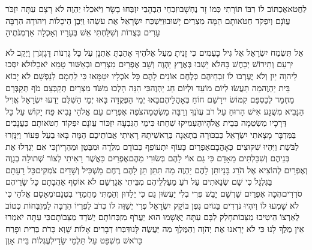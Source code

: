 \documentclass[../main/main.tex]{subfiles}
\begin{document}
\begin{multicols}{\ncols}
לַחֲטֹא\PreVerseSpace{}אֶכְתּוֹב לוֹ רִבּוֹ תּוֹרָתִי כְּמוֹ זָר נֶחְשָׁבוּ\PreVerseSpace{}זִבְחֵי הַבְהָבַי יִזְבְּחוּ בָשָׂר וַיֹּאכֵלוּ יַהְוֶה לֹא רָצָם עַתָּה יִזְכֹּר עֲוֺנָם וְיִפְקֹד חַטֹּאותָם הֵמָּה מִצְרַיִם יָשׁוּבוּ\PreVerseSpace{}וַיִּשְׁכַּח יִשְׂרָאֵל אֶת עֹשֵׂהוּ וַיִּבֶן הֵיכָלוֹת וִיהוּדָה הִרְבָּה עָרִים בְּצֻרוֹת וְשִׁלַּחְתִּי אֵשׁ בְּעָרָיו וְאָכְלָה אַרְמְנֹתֶיהָ\OpenSection{}\par
{}אַל תִּשְׂמַח יִשְׂרָאֵל אֶל גִּיל כָּעַמִּים כִּי זָנִיתָ מֵעַל אֱלֹהֶיךָ אָהַבְתָּ אֶתְנָן עַל כָּל גָּרְנוֹת דָּגָן\PreVerseSpace{}גֹּרֶן וָיֶקֶב לֹא יִרְעֵם וְתִירוֹשׁ יְכַחֶשׁ בָּהּ\PreVerseSpace{}לֹא יֵשְׁבוּ בְּאֶרֶץ יַהְוֶה וְשָׁב אֶפְרַיִם מִצְרַיִם וּבְאַשּׁוּר טָמֵא יֹאכֵלוּ\PreVerseSpace{}לֹא יִסְּכוּ לַיהוָה יַיִן וְלֹא יֶעֶרְבוּ לוֹ זִבְחֵיהֶם כְּלֶחֶם אוֹנִים לָהֶם כָּל אֹכְלָיו יִטַּמָּאוּ כִּי לַחְמָם לְנַפְשָׁם לֹא יָבוֹא בֵּית יַהְוֶה\PreVerseSpace{}מַה תַּעֲשׂוּ לְיוֹם מוֹעֵד וּלְיוֹם חַג יַהְוֶה\PreVerseSpace{}כִּי הִנֵּה הָלְכוּ מִשֹּׁד מִצְרַיִם תְּקַבְּצֵם מֹף תְּקַבְּרֵם מַחְמַד לְכַסְפָּם קִמּוֹשׂ יִירָשֵׁם חוֹחַ בְּאָהֳלֵיהֶם\PreVerseSpace{}בָּאוּ יְמֵי הַפְּקֻדָּה בָּאוּ יְמֵי הַשִּׁלֻּם יֵדְעוּ יִשְׂרָאֵל אֱוִיל הַנָּבִיא מְשֻׁגָּע אִישׁ הָרוּחַ עַל רֹב עֲוֺנְךָ וְרַבָּה מַשְׂטֵמָה\PreVerseSpace{}צֹפֶה אֶפְרַיִם עַם\SubEnd{} אֱלֹהָי נָבִיא פַּח יָקוֹשׁ עַל כָּל דְּרָכָיו מַשְׂטֵמָה בְּבֵית אֱלֹהָיו\PreVerseSpace{}הֶעְמִיקוּ שִׁחֵתוּ כִּימֵי הַגִּבְעָה יִזְכּוֹר עֲוֺנָם יִפְקוֹד חַטֹּאותָם \ClosedSection{}כַּעֲנָבִים בַּמִּדְבָּר מָצָאתִי יִשְׂרָאֵל כְּבִכּוּרָה בִתְאֵנָה בְּרֵאשִׁיתָהּ רָאִיתִי אֲבוֹתֵיכֶם הֵמָּה בָּאוּ בַעַל פְּעוֹר וַיִּנָּזְרוּ לַבֹּשֶׁת וַיִּהְיוּ שִׁקּוּצִים כְּאָהֳבָם\PreVerseSpace{}אֶפְרַיִם כָּעוֹף יִתְעוֹפֵף כְּבוֹדָם מִלֵּדָה וּמִבֶּטֶן וּמֵהֵרָיוֹן\PreVerseSpace{}כִּי אִם יְגַדְּלוּ אֶת בְּנֵיהֶם וְשִׁכַּלְתִּים מֵאָדָם כִּי גַם אוֹי לָהֶם בְּשׂוּרִי מֵהֶם\PreVerseSpace{}אֶפְרַיִם כַּאֲשֶׁר רָאִיתִי לְצוֹר שְׁתוּלָה בְנָוֶה וְאֶפְרַיִם לְהוֹצִיא אֶל הֹרֵג בָּנָיו\PreVerseSpace{}תֵּן לָהֶם יַהְוֶה מַה תִּתֵּן תֵּן לָהֶם רֶחֶם מַשְׁכִּיל וְשָׁדַיִם צֹמְקִים\PreVerseSpace{}כָּל רָעָתָם בַּגִּלְגָּל כִּי שָׁם שְׂנֵאתִים עַל רֹעַ מַעַלְלֵיהֶם מִבֵּיתִי אֲגָרְשֵׁם לֹא אוֹסֵף אַהֲבָתָם כָּל שָׂרֵיהֶם סֹרְרִים\PreVerseSpace{}הֻכָּה אֶפְרַיִם שָׁרְשָׁם יָבֵשׁ פְּרִי בְלִי יַעֲשׂוּן גַּם כִּי יֵלֵדוּן וְהֵמַתִּי מַחֲמַדֵּי בִטְנָם\PreVerseSpace{}יִמְאָסֵם אֱלֹהַי כִּי לֹא שָׁמְעוּ לוֹ וְיִהְיוּ נֹדְדִים בַּגּוֹיִם \ClosedSection{}גֶּפֶן בּוֹקֵק יִשְׂרָאֵל פְּרִי יְשַׁוֶּה לּוֹ כְּרֹב לְפִרְיוֹ הִרְבָּה לַמִּזְבְּחוֹת כְּטוֹב לְאַרְצוֹ הֵיטִיבוּ מַצֵּבוֹת\PreVerseSpace{}חָלַק לִבָּם עַתָּה יֶאְשָׁמוּ הוּא יַעֲרֹף מִזְבְּחוֹתָם יְשֹׁדֵד מַצֵּבוֹתָם\PreVerseSpace{}כִּי עַתָּה יֹאמְרוּ אֵין מֶלֶךְ לָנוּ כִּי לֹא יָרֵאנוּ אֶת יְהֹוָה וְהַמֶּלֶךְ מַה יַּעֲשֶׂה לָּנוּ\PreVerseSpace{}דִּבְּרוּ דְבָרִים אָלוֹת שָׁוְא כָּרֹת בְּרִית וּפָרַח כָּרֹאשׁ מִשְׁפָּט עַל תַּלְמֵי שָׂדָי\PreVerseSpace{}לְעֶגְלוֹת בֵּית אָוֶן 
\end{multicols}
\end{document}
